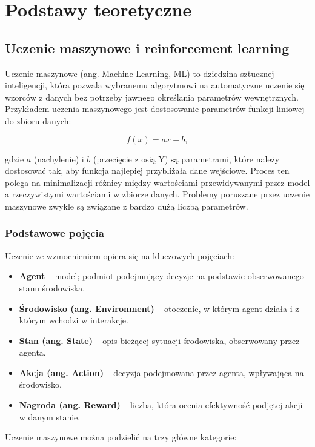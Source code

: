 \chapter{Podstawy teoretyczne}

\section{Uczenie maszynowe i reinforcement learning}

Uczenie maszynowe (ang. Machine Learning, ML) to dziedzina sztucznej inteligencji, która pozwala wybranemu algorytmowi na automatyczne uczenie się wzorców z danych bez potrzeby jawnego określania parametrów wewnętrznych. Przykładem uczenia maszynowego jest dostosowanie parametrów funkcji liniowej do zbioru danych:

\[
f(x) = ax + b,
\]

gdzie \(a\) (nachylenie) i \(b\) (przecięcie z osią Y) są parametrami, które należy dostosować tak, aby funkcja najlepiej przybliżała dane wejściowe. Proces ten polega na minimalizacji różnicy między wartościami przewidywanymi przez model a rzeczywistymi wartościami w zbiorze danych. Problemy poruszane przez uczenie maszynowe zwykle są związane z bardzo dużą liczbą parametrów.

\subsection{Podstawowe pojęcia}

Uczenie ze wzmocnieniem opiera się na kluczowych pojęciach: 
\begin{itemize}
    \item \textbf{Agent} – model; podmiot podejmujący decyzje na podstawie obserwowanego stanu środowiska.
    \item \textbf{Środowisko (ang. Environment)} – otoczenie, w którym agent działa i z którym wchodzi w interakcje.
    \item \textbf{Stan (ang. State)} – opis bieżącej sytuacji środowiska, obserwowany przez agenta.
    \item \textbf{Akcja (ang. Action)} – decyzja podejmowana przez agenta, wpływająca na środowisko.
    \item \textbf{Nagroda (ang. Reward)} – liczba, która ocenia efektywność podjętej akcji w danym stanie.
\end{itemize}

Uczenie maszynowe można podzielić na trzy główne kategorie:

